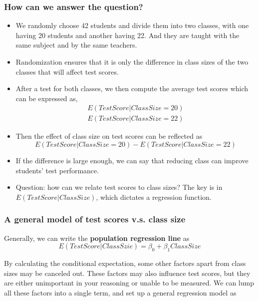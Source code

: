 \documentclass[a4paper,11pt]{article}
\begin{document}
\subsubsection*{How can we answer the question?}
\label{sec:orgc0b53f9}
\begin{itemize}
\item We randomly choose 42 students and divide them into two classes,
with one having 20 students and another having 22. And they are
taught with the same subject and by the same teachers.
\item Randomization ensures that it is only the difference in class
sizes of the two classes that will affect test scores.
\item After a test for both classes, we then compute the average test
scores which can be expressed as, 
\begin{gather*}
E(TestScore | ClassSize = 20) \\
E(TestScore | ClassSize = 22) 
\end{gather*}
\item Then the effect of class size on test scores can be reflected as
\begin{equation*}
E(TestScore | ClassSize = 20) - E(TestScore | ClassSize = 22)
\end{equation*}
\item If the difference is large enough, we can say that reducing class
can improve students' test performance.
\item Question: how can we relate test scores to class sizes?  The key is
in \(E(TestScore | ClassSize)\), which dictates a regression function.
\end{itemize}

\subsubsection*{A general model of test scores v.s. class size}
\label{sec:org7de9008}
Generally, we can write the \textbf{population regression line} as
\begin{equation}
\label{eq:popreg-testscore}
E(TestScore | ClassSzie) = \beta_0 + \beta_1 ClassSize
\end{equation}

By calculating the conditional expectation, some other factors apart
from class sizes may be canceled out. These factors may also influence
test scores, but they are either unimportant in your reasoning or
unable to be measured. We can lump all these factors into a
single term, and set up a general regression model as
\end{document}
